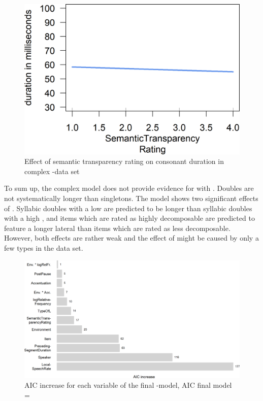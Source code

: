 \begin{figure}
	\includegraphics [scale=0.5] {images/Experiment/LyModelRating}
	\caption{Effect of semantic transparency rating on consonant duration in complex -data set}
	\label{fig: Rating  lyComplex experiment}
\end{figure}


To sum up, the complex model does not provide evidence for  with . Doubles are not systematically longer than singletons. 
The model shows two significant effects of . Syllabic doubles with a low  are predicted to be longer than syllabic doubles with a high , and items which are rated as highly decomposable are predicted to feature a longer lateral than items which are rated as less decomposable. However, both effects are rather weak and the effect of  might be caused by only a few types in the data set.

\begin{figure}
	
		
	\includegraphics[scale=0.7]{images/Experiment/AICdecreaseLYComplex.png}
	\caption{AIC increase for each variable of the final -model, AIC final model = }
	\label{fig:Effect sozed ly compl Exp}

\end{figure}


